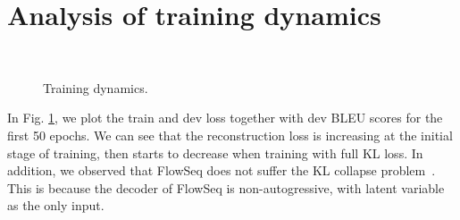 \documentclass[11pt,a4paper]{article}
\begin{document}
\newpage
\section{Analysis of training dynamics}
\begin{figure}[h]
  \begin{minipage}[t]{1.0\columnwidth}
  \centering
  \\
  \end{minipage}
  \caption{Training dynamics.}
  \label{fig:dynamic}
\end{figure}
In Fig. \ref{fig:dynamic}, we plot the train and dev loss together with dev BLEU scores for the first 50 epochs. We can see that the reconstruction loss is increasing at the initial stage of training, then starts to decrease when training with full KL loss.
In addition, we observed that FlowSeq does not suffer the KL collapse problem~\citep{bowman2015generating,iclr2019:ma:mae}.
This is because the decoder of FlowSeq is non-autogressive, with latent variable  as the only input.

\newpage
\end{document}
